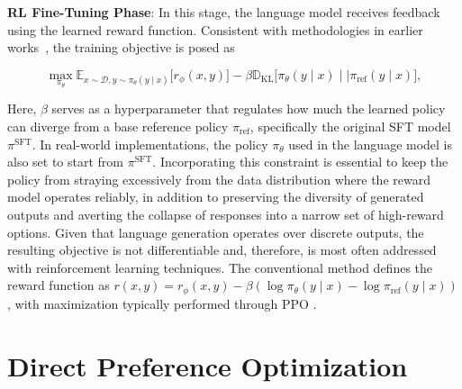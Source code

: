 \textbf{RL Fine-Tuning Phase}: In this stage, the language model receives feedback using the learned reward function. Consistent with methodologies in earlier works~\citep{jaques2017sequence, jaques2020human}, the training objective is posed as

\begin{equation}\label{eq:RL}
\max_{\pi_{\theta}}  \mathbb{E}_{x\sim \mathcal{D}, y\sim \pi_{\theta}(y \mid x)}\bigl[r_{\phi}(x, y)\bigr] - \beta\mathbb{D}_{\textrm{KL}}\bigl[\pi_{\theta}(y\mid x)\mid \mid \pi_\text{ref}(y\mid x)\bigr],
\end{equation}

Here, $\beta$ serves as a hyperparameter that regulates how much the learned policy can diverge from a base reference policy $\pi_\text{ref}$, specifically the original SFT model $\pi^\text{SFT}$. In real-world implementations, the policy $\pi_\theta$ used in the language model is also set to start from $\pi^\text{SFT}$. Incorporating this constraint is essential to keep the policy from straying excessively from the data distribution where the reward model operates reliably, in addition to preserving the diversity of generated outputs and averting the collapse of responses into a narrow set of high-reward options. Given that language generation operates over discrete outputs, the resulting objective is not differentiable and, therefore, is most often addressed with reinforcement learning techniques. The conventional method \citep{ziegler2020finetuning, stiennon2022learning, bai2022training, ouyang2022training} defines the reward function as ${r(x, y) = r_{\phi}(x, y) -\beta (\log \pi_{\theta}(y\mid x) - \log \pi_\text{ref}(y\mid x))}$, with maximization typically performed through PPO \cite{schulman2017proximal}.

\section{Direct Preference Optimization}\label{sec:DPO}

